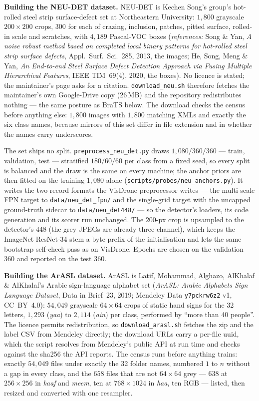 \medskip\noindent\textbf{Building the NEU-DET dataset.} NEU-DET is
Kechen Song's group's hot-rolled steel strip surface-defect set at
Northeastern University: $1{,}800$ grayscale $200\times200$ crops, $300$
for each of crazing, inclusion, patches, pitted surface, rolled-in scale
and scratches, with $4{,}189$ Pascal-VOC boxes (\emph{references:} Song \&
Yan, \emph{A noise robust method based on completed local binary patterns
for hot-rolled steel strip surface defects}, Appl.\ Surf.\ Sci.~285, 2013,
the images; He, Song, Meng \& Yan, \emph{An End-to-end Steel Surface Defect
Detection Approach via Fusing Multiple Hierarchical Features}, IEEE
TIM~69(4), 2020, the boxes). No licence is stated; the maintainer's page
asks for a citation. \texttt{download\_neu.sh} therefore fetches the
maintainer's own Google-Drive copy (26\,MB) and the repository
redistributes nothing --- the same posture as BraTS below. The download
checks the census before anything else: $1{,}800$ images with $1{,}800$
matching XMLs and exactly the six class names, because mirrors of this set
differ in file extension and in whether the names carry underscores.

The set ships no split. \texttt{preprocess\_neu\_det.py} draws
$1{,}080/360/360$ --- train, validation, test --- stratified $180/60/60$
per class from a fixed seed, so every split is balanced and the draw is
the same on every machine; the anchor priors are then fitted on the
training $1{,}080$ alone (\texttt{scripts/probes/\allowbreak neu\_anchors.py}). It writes the
two record formats the VisDrone preprocessor writes --- the multi-scale
FPN target to \texttt{data/neu\_det\_fpn/} and the single-grid target
with the uncapped ground-truth sidecar to \texttt{data/neu\_det448/} ---
so the detector's loaders, its code generation and its scorer run
unchanged. The $200$-px crop is upsampled to the detector's $448$
(the grey JPEGs are already three-channel), which keeps the ImageNet
ResNet-34 stem a byte prefix of the initialisation and lets the same
bootstrap self-check pass as on VisDrone. Epochs are chosen on the
validation $360$ and reported on the test $360$.

\medskip\noindent\textbf{Building the ArASL dataset.} ArASL is Latif,
Mohammad, Alghazo, AlKhalaf \& AlKhalaf's Arabic sign-language alphabet set
(\emph{ArASL: Arabic Alphabets Sign Language Dataset}, Data in Brief~23,
2019; Mendeley Data \texttt{y7pckrw6z2} v1, CC~BY~4.0): $54{,}049$
grayscale $64\times64$ crops of static hand signs for the 32 letters,
$1{,}293$ (\emph{yaa}) to $2{,}114$ (\emph{ain}) per class, performed by
``more than 40 people''. The licence permits redistribution, so
\texttt{download\_arasl.sh} fetches the zip and the label CSV from Mendeley
directly; the download URLs carry a per-file uuid, which the script resolves
from Mendeley's public API at run time and checks against the sha256 the API
reports. The census runs before anything trains: exactly $54{,}049$ files
under exactly the 32 folder names, numbered $1$ to $n$ without a gap in every
class, and the $658$ files that are not $64\times64$ grey --- $638$ at
$256\times256$ in \emph{kaaf} and \emph{meem}, ten at $768\times1024$ in
\emph{haa}, ten RGB --- listed, then resized and converted with one
resampler.

